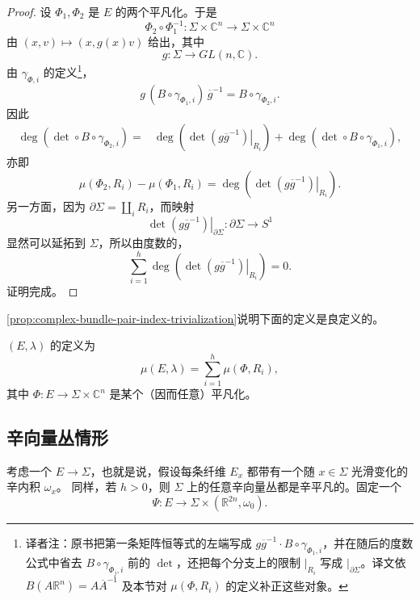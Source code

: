 \begin{proof}
设 $\Phi_1,\Phi_2$ 是 $E$ 的两个平凡化。于是
\[
  \Phi_2\circ\Phi_1^{-1}:
  \Sigma\times\mathbb C^n\longrightarrow\Sigma\times\mathbb C^n
\]
由 $(x,v)\mapsto(x,g(x)v)$ 给出，其中
\[
  g:\Sigma\longrightarrow GL(n,\mathbb C).
\]
由 $\gamma_{\Phi,i}$ 的定义\footnote{译者注：原书把第一条矩阵恒等式的左端写成
$g\overline g^{-1}\cdot B\circ\gamma_{\Phi_1,i}$，并在随后的度数公式中省去
$B\circ\gamma_{\Phi_j,i}$ 前的 $\det$，还把每个分支上的限制 $|_{R_i}$
写成 $|_{\partial\Sigma}$。译文依 $B(A\mathbb R^n)=A\overline A^{-1}$
及本节对 $\mu(\Phi,R_i)$ 的定义补正这些对象。}，
\[
  g\,(B\circ\gamma_{\Phi_1,i})\,\overline g^{-1}
  =B\circ\gamma_{\Phi_2,i}.
\]
因此
\[
\begin{aligned}
  \deg(\det\circ B\circ\gamma_{\Phi_2,i})
  ={}&
  \deg\left(\left.\det(g\overline g^{-1})\right|_{R_i}\right)
  +\deg(\det\circ B\circ\gamma_{\Phi_1,i}),
\end{aligned}
\]
亦即
\[
  \mu(\Phi_2,R_i)-\mu(\Phi_1,R_i)
  =\deg\left(\left.\det(g\overline g^{-1})\right|_{R_i}\right).
\]
另一方面，因为 $\partial\Sigma=\coprod_iR_i$，而映射
\[
  \left.\det(g\overline g^{-1})\right|_{\partial\Sigma}:
  \partial\Sigma\longrightarrow S^1
\]
显然可以延拓到 $\Sigma$，所以由度数的\termCobordismInvariance{}，
\[
  \sum_{i=1}^h
  \deg\left(\left.\det(g\overline g^{-1})\right|_{R_i}\right)=0.
\]
证明完成。
\end{proof}

\cref{prop:complex-bundle-pair-index-trivialization}说明下面的定义是良定义的。

\begin{definition}
\label{def:complex-bundle-pair-maslov-index}
\termBundlePair{} $(E,\lambda)$ 的\termMaslovIndex{}定义为
\begin{equation}
  \mu(E,\lambda)=\sum_{i=1}^h\mu(\Phi,R_i),
\label{eq:complex-bundle-pair-maslov-index}
\end{equation}
其中 $\Phi:E\to\Sigma\times\mathbb C^n$ 是某个（因而任意）平凡化。
\end{definition}

\subsection{辛向量丛情形}
\label{subsec:symplectic-vector-bundle-pairs}

考虑一个\termSymplecticVectorBundle{} $E\to\Sigma$，也就是说，假设每条纤维
$E_x$ 都带有一个随 $x\in\Sigma$ 光滑变化的辛内积 $\omega_x$。
同样，若 $h>0$，则 $\Sigma$ 上的任意辛向量丛都是辛平凡的。固定一个\termSymplecticTrivialization{}
\[
  \Psi:E\longrightarrow\Sigma\times(\mathbb R^{2n},\omega_0).
\]

